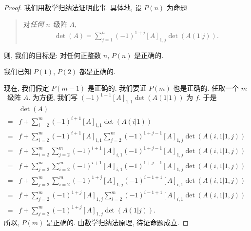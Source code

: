 \begin{proof}
    我们用数学归纳法证明此事.
    具体地, 设 \(P(n)\) 为命题
    \begin{quotation}
        对\emph{任何} \(n\)~级阵 \(A\),
        \begin{align*}
            \det {(A)} = \sum_{j = 1}^{n}
            {(-1)^{1+j} [A]_{1,j} \det {(A(1|j))}}.
        \end{align*}
    \end{quotation}
    则, 我们的目标是:
    对任何正整数 \(n\), \(P(n)\) 是正确的.

    我们已知 \(P(1)\), \(P(2)\) 都是正确的.

    现在, 我们假定 \(P(m-1)\) 是正确的.
    我们要证 \(P(m)\) 也是正确的.
    任取一个 \(m\)~级阵 \(A\).
    为方便, 我们写
    \((-1)^{1+1} [A]_{1,1} \det {(A(1|1))}\)
    为 \(f\).
    于是%
    \begin{align*}
             & \det {(A)} \\
        = {} &
        f
        +
        \sum_{i = 2}^{m} {
        (-1)^{i+1} [A]_{i,1} \det {(A(i|1))}
        }
        \tag*{(1)}
        \\
        = {} &
        f
        +
        \sum_{i = 2}^{m} {
        (-1)^{i+1} [A]_{i,1}
        \sum_{j = 2}^{m} {
        (-1)^{1+j-1} [A]_{1,j} \det {(A(i,1|1,j))}
        }
        }
        \tag*{(2)}
        \\
        = {} &
        f
        +
        \sum_{i = 2}^{m} {
        \sum_{j = 2}^{m} {
        (-1)^{i+1} [A]_{i,1}
        (-1)^{1+j-1} [A]_{1,j} \det {(A(i,1|1,j))}
        }
        }
        \tag*{(3)}
        \\
        = {} &
        f
        +
        \sum_{j = 2}^{m} {
        \sum_{i = 2}^{m} {
        (-1)^{i+1} [A]_{i,1}
        (-1)^{1+j-1} [A]_{1,j} \det {(A(i,1|1,j))}
        }
        }
        \tag*{(4)}
        \\
        = {} &
        f
        +
        \sum_{j = 2}^{m} {
        \sum_{i = 2}^{m} {
        (-1)^{1+j} [A]_{1,j}
        (-1)^{i-1+1} [A]_{i,1} \det {(A(i,1|1,j))}
        }
        }
        \tag*{(5)}
        \\
        = {} &
        f
        +
        \sum_{j = 2}^{m} {
        (-1)^{1+j} [A]_{1,j}
        \sum_{i = 2}^{m} {
        (-1)^{i-1+1} [A]_{i,1} \det {(A(i,1|1,j))}
        }
        }
        \tag*{(6)}
        \\
        = {} &
        f
        +
        \sum_{j = 2}^{m} {
        (-1)^{1+j} [A]_{1,j} \det {(A(1|j))}
        }.
        \tag*{(7)}
    \end{align*}%
    所以, \(P(m)\) 是正确的.
    由数学归纳法原理, 待证命题成立.


\end{proof}
